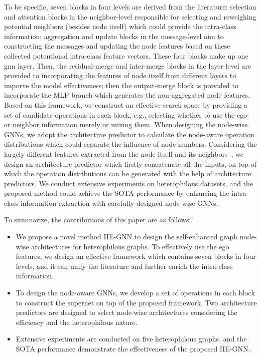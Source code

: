 \documentclass[sigconf]{acmart}
\begin{document}
To be specific, seven blocks in four levels are derived from the literature: 
selection and attention blocks in the neighbor-level responsible for selecting and reweighing potential neighbors (besides node itself) which could provide the intra-class information; 
aggregation and update blocks in the message-level aim to constructing the messages and updating the node features based on these collected potentional intra-class feature vectors. These four blocks make up one gnn layer. 
Then, the residual-merge and inter-merge blocks in the layer-level are provided to incorporating the features of node itself from different layers to imporve the model effectiveness; then the output-merge block is provided to incorporate the MLP branch which generates the non-aggregated node features.
Based on this framework, we construct an effective search space by providing a set of candidate operations in each block, e.g., selecting whether to use the ego- or neighbor information merely or mixing them. 
When designing the node-wise GNNs, we adopt the architecture predictor to calculate the node-aware operation distributions which could separate the influence of node numbers. 
Considering the largely different features extracted from the node itself and its neighbors~\cite{zhu2020beyond},
we design an architecture predictor which firstly concatenate all the inputs, on top of which the operation distributions can be generated with the help of  architecture predictors.
We conduct extensive experiments on heterophilous datasets, and the proposed method could achieve the SOTA performance by enhancing the intra-class information extraction with carefully designed node-wise GNNs.












To summarize, the contributions of this paper are as follows:

\begin{itemize}
	\item We propose a novel method IIE-GNN to design the self-enhanced graph node-wise architectures for heterophilous graphs.
	To effectively use the ego features, we design an effective framework which contains seven blocks in four levels, and it can unify the literature and further enrich the intra-class information.
	\item  To design the node-aware GNNs, we develop a set of operations in each block to construct the supernet on top of the proposed framework. Two architecture predictors are designed to select node-wise architectures considering the efficiency and the heterophilous nature.
\item Extensive experiments are conducted on five heterophilous graphs, and the SOTA performance demonstrate the effectiveness of the proposed IIE-GNN.
\end{itemize}
\end{document}
